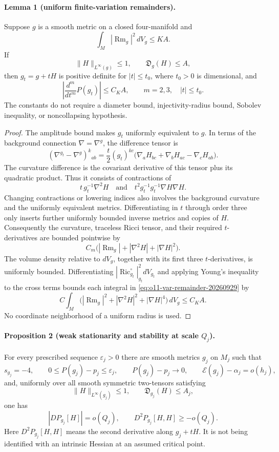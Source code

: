 \documentclass[11pt]{article}
\begin{document}
\paragraph{Lemma 1 (uniform finite-variation remainders).}
Suppose $g$ is a smooth metric on a closed four-manifold and
\[
 \int_M|\operatorname{Rm}_g|^2\,dV_g\le KA.
\]
If
\[
 \|H\|_{L^\infty(g)}\le1,\qquad \mathfrak D_g(H)\le A,
\]
then $g_t=g+tH$ is positive definite for $|t|\le t_0$, where $t_0>0$
is dimensional, and
\begin{equation}
 \left|\frac{d^m}{dt^m}P(g_t)\right|\le C_K A,
 \qquad m=2,3,\quad |t|\le t_0.
 \label{eq:o11-var-remainder-20260929}
\end{equation}
The constants do not require a diameter bound, injectivity-radius bound,
Sobolev inequality, or noncollapsing hypothesis.

\begin{proof}
The amplitude bound makes $g_t$ uniformly equivalent to $g$. In terms of
the background connection $\nabla=\nabla^g$, the difference tensor is
\[
 (\nabla^{g_t}-\nabla^g)^k{}_{ab}
 =\frac t2(g_t)^{kc}
   \bigl(\nabla_aH_{bc}+\nabla_bH_{ac}-\nabla_cH_{ab}\bigr).
\]
The curvature difference is the covariant derivative of this tensor plus
its quadratic product. Thus it consists of contractions of
\[
 t\,g_t^{-1}\nabla^2H
 \quad\text{and}\quad
 t^2g_t^{-1}g_t^{-1}\nabla H\nabla H.
\]
Changing contractions or lowering indices also involves the background
curvature and the uniformly equivalent metrics. Differentiating in $t$
through order three only inserts further uniformly bounded inverse
metrics and copies of $H$. Consequently the curvature, traceless Ricci
tensor, and their required $t$-derivatives are bounded pointwise by
\[
 C_m\bigl(|\operatorname{Rm}_g|+|\nabla^2H|+|\nabla H|^2\bigr).
\]
The volume density relative to $dV_g$, together with its first three
$t$-derivatives, is uniformly bounded. Differentiating
$|\operatorname{Ric}^{\circ}_{g_t}|_{g_t}^2dV_{g_t}$ and applying Young's
inequality to the cross terms bounds each integral in
\eqref{eq:o11-var-remainder-20260929} by
\[
 C\int_M\bigl(|\operatorname{Rm}_g|^2
                  +|\nabla^2H|^2+|\nabla H|^4\bigr)\,dV_g
 \le C_KA.
\]
No coordinate neighborhood of a uniform radius is used.
\end{proof}

\paragraph{Proposition 2 (weak stationarity and stability at scale $Q_j$).}
For every prescribed sequence $\varepsilon_j>0$ there are smooth metrics
$g_j$ on $M_j$ such that
\[
 s_{g_j}=-4,\qquad 0\le P(g_j)-p_j\le\varepsilon_j,
 \qquad P(g_j)-p_j\longrightarrow0,
 \qquad \mathcal E(g_j)-\alpha_j=o(h_j),
\]
and, uniformly over all smooth symmetric two-tensors satisfying
\[
 \|H\|_{L^\infty(g_j)}\le1,\qquad
 \mathfrak D_{g_j}(H)\le A_j,
\]
one has
\begin{equation}
 |DP_{g_j}[H]|=o(Q_j),\qquad
 D^2P_{g_j}[H,H]\ge-o(Q_j).
 \label{eq:o11-var-selection-20260929}
\end{equation}
Here $D^2P_{g_j}[H,H]$ means the second derivative along $g_j+tH$.
It is not being identified with an intrinsic Hessian at an assumed
critical point.
\end{document}
